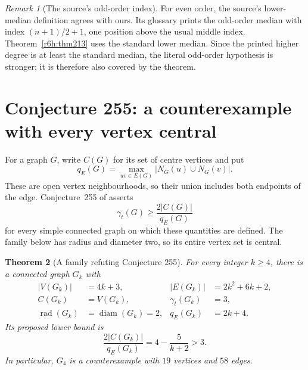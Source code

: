 \documentclass[11pt,a4paper]{article}
\newtheorem{theorem}{Theorem}[section]
\theoremstyle{remark}
\newtheorem{remark}[theorem]{Remark}
\begin{document}
\begin{remark}[The source's odd-order index]
\label{r6h:medianconvention}
For even order, the source's lower-median definition agrees with
ours.
Its glossary prints the odd-order median with index
$(n+1)/2+1$, one position above the usual middle index.
Theorem~\ref{r6h:thm213} uses the standard lower median.
Since the printed higher degree is at least the standard median,
the literal odd-order hypothesis is stronger; it is therefore also
covered by the theorem.
\end{remark}


\section{Conjecture 255: a counterexample with every vertex central}
\label{r6:sec255}

For a graph $G$, write $C(G)$ for its set of centre vertices and put
\[
 q_E(G)=\max_{uv\in E(G)}|N_G(u)\cup N_G(v)|.
\]
These are open vertex neighbourhoods, so their union includes both
endpoints of the edge.  Conjecture~255 of \cite{WOWII} asserts
\begin{equation}
  \gamma_t(G)\ge\frac{2|C(G)|}{q_E(G)}
  \label{r6:255-assertion}
\end{equation}
for every simple connected graph on which these quantities are defined.
The family below has radius and diameter two, so its entire vertex set
is central.

\begin{theorem}[A family refuting Conjecture 255]
\label{r6:255-family}
For every integer $k\ge4$, there is a connected graph $G_k$ with
\begin{align*}
 |V(G_k)|&=4k+3,& |E(G_k)|&=2k^2+6k+2,\\
 C(G_k)&=V(G_k),&\gamma_t(G_k)&=3,\\
 \operatorname{rad}(G_k)&=\operatorname{diam}(G_k)=2,
 &q_E(G_k)&=2k+4.
\end{align*}
Its proposed lower bound is
\[
 \frac{2|C(G_k)|}{q_E(G_k)}
   =4-\frac{5}{k+2}>3.
\]
In particular, $G_4$ is a counterexample with $19$ vertices and $58$
edges.
\end{theorem}
\end{document}
